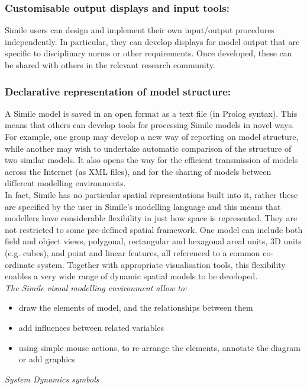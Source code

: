 	\subsubsection{Customisable output displays and input tools:}
Simile users can design and implement their own input/output procedures independently. In particular, they can develop displays for model output that are specific to disciplinary norms or other requirements. Once developed, these can be shared with others in the relevant research community.
	\subsubsection{Declarative representation of model structure:}
A Simile model is saved in an open format as a text file (in Prolog syntax). This means that others can develop tools for processing Simile models in novel ways. For example, one group may develop a new way of reporting on model structure, while another may wish to undertake automatic comparison of the structure of two similar models. It also opens the way for the efficient transmission of models across the Internet (as XML files), and for the sharing of models between different modelling environments.\\
	
In fact, Simile has no particular spatial representations built into it, rather these are specified by the user in Simile's modelling language and this means that modellers have considerable flexibility in just how space is represented. They are not restricted to some pre-defined spatial framework. One model can include both field and object views, polygonal, rectangular and hexagonal areal units, 3D units (e.g. cubes), and point and linear features, all referenced to a common co-ordinate system. Together with appropriate visualisation tools, this flexibility enables a very wide range of dynamic spatial models to be developed.\\
	
\emph{The Simile visual modelling environment allow to:}
\begin{itemize}
	\item draw the elements of model, and the relationships between them
	\item add influences between related variables
	\item using simple mouse actions, to re-arrange the elements, annotate the diagram or add graphics
\end{itemize}	
	
\emph{System Dynamics symbols}

